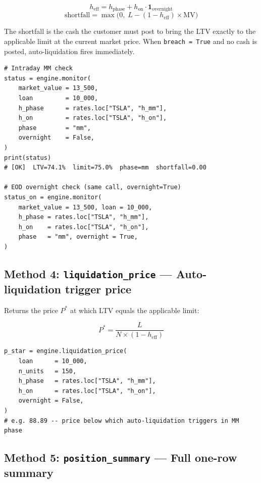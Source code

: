 \documentclass[9pt, a4paper]{extarticle}
\newenvironment{formulabox}{\par\addvspace{4pt}}{\par\addvspace{4pt}}
\begin{document}
\begin{formulabox}
\[
    h_{\mathrm{eff}} = h_{\mathrm{phase}} + h_{\mathrm{on}} \cdot \mathbf{1}_{\mathrm{overnight}}
\]
\[
    \mathrm{shortfall} = \max\!\bigl(0,\; L - (1 - h_{\mathrm{eff}}) \times \mathrm{MV}\bigr)
\]
\end{formulabox}

The shortfall is the cash the customer must post to bring the LTV exactly to the
applicable limit at the current market price. When \texttt{breach = True} and
no cash is posted, auto-liquidation fires immediately.

\begin{lstlisting}
# Intraday MM check
status = engine.monitor(
    market_value = 13_500,
    loan         = 10_000,
    h_phase      = rates.loc["TSLA", "h_mm"],
    h_on         = rates.loc["TSLA", "h_on"],
    phase        = "mm",
    overnight    = False,
)
print(status)
# [OK]  LTV=74.1%  limit=75.0%  phase=mm  shortfall=0.00

# EOD overnight check (same call, overnight=True)
status_on = engine.monitor(
    market_value = 13_500, loan = 10_000,
    h_phase = rates.loc["TSLA", "h_mm"],
    h_on    = rates.loc["TSLA", "h_on"],
    phase   = "mm", overnight = True,
)
\end{lstlisting}

\subsection{Method 4: \texttt{liquidation\_price} — Auto-liquidation trigger price}

Returns the price $P^*$ at which LTV equals the applicable limit:

\begin{formulabox}
\[
    P^{*} = \frac{L}{N \times (1 - h_{\mathrm{eff}})}
\]
\end{formulabox}

\begin{lstlisting}
p_star = engine.liquidation_price(
    loan      = 10_000,
    n_units   = 150,
    h_phase   = rates.loc["TSLA", "h_mm"],
    h_on      = rates.loc["TSLA", "h_on"],
    overnight = False,
)
# e.g. 88.89 -- price below which auto-liquidation triggers in MM phase
\end{lstlisting}

\subsection{Method 5: \texttt{position\_summary} — Full one-row summary}
\end{document}
